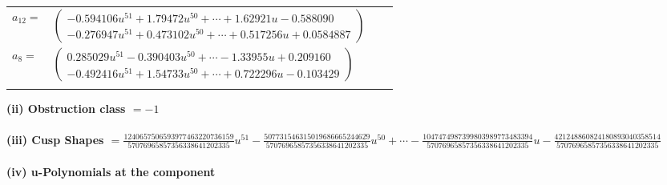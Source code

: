 \documentclass[1p]{elsarticle_modified}
\theoremstyle{definition}
\begin{document}
\begin{tabular}{m{7pt} m{180pt} m{7pt} m{180pt} }
\flushright $a_{12}=$&$\begin{pmatrix}-0.594106 u^{51}+1.79472 u^{50}+\cdots+1.62921 u-0.588090\\-0.276947 u^{51}+0.473102 u^{50}+\cdots+0.517256 u+0.0584887\end{pmatrix}$ \\
\flushright $a_{8}=$&$\begin{pmatrix}0.285029 u^{51}-0.390403 u^{50}+\cdots-1.33955 u+0.209160\\-0.492416 u^{51}+1.54733 u^{50}+\cdots+0.722296 u-0.103429\end{pmatrix}$\\&\end{tabular}
\flushleft \textbf{(ii) Obstruction class $= -1$}\\~\\
\flushleft \textbf{(iii) Cusp Shapes $= \frac{1240657506593977463220736159}{57076965857356338641202335} u^{51}-\frac{507731546315019686665244629}{57076965857356338641202335} u^{50}+\cdots-\frac{1047474987399803989773483394}{57076965857356338641202335} u-\frac{421248860824180893040358514}{57076965857356338641202335}$}\\~\\
\newpage\renewcommand{\arraystretch}{1}
\flushleft \textbf{(iv) u-Polynomials at the component}\newline \\
\end{document}
